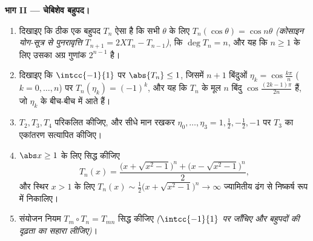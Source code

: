 \begin{problem}
\medskip
\noindent\textbf{भाग II --- चेबिशेव बहुपद।}
\begin{enumerate}[resume]
  \item दिखाइए कि ठीक एक बहुपद $T_n$ ऐसा है कि सभी $\theta$ के लिए $T_n(\cos\theta) = \cos n\theta$
        \emph{(कोसाइन योग-सूत्र से पुनरावृत्ति $T_{n+1} = 2XT_n - T_{n-1}$)}, कि $\deg T_n = n$, और यह कि
        $n \geq 1$ के लिए उसका अग्र गुणांक $2^{n-1}$ है।
  \item दिखाइए कि $\intcc{-1}{1}$ पर $\abs{T_n} \leq 1$, जिसमें $n + 1$ बिंदुओं $\eta_k =
        \cos\frac{k\pi}{n}$ ($k = 0, \dots, n$) पर $T_n(\eta_k) = (-1)^k$,
        और यह कि $T_n$ के मूल $n$ बिंदु $\cos\frac{(2k-1)\pi}{2n}$ हैं, जो $\eta_k$ के बीच-बीच
        में आते हैं।
  \item $T_2, T_3, T_4$ परिकलित कीजिए, और सीधे मान रखकर $\eta_0, \dots, \eta_3 = 1, \frac12, -\frac12,
        -1$ पर $T_3$ का एकांतरण
        सत्यापित कीजिए।
  \item $\abs x \geq 1$ के लिए सिद्ध कीजिए
        \[
        T_n(x) = \frac{\bigl(x + \sqrt{x^2 - 1}\bigr)^n +
        \bigl(x - \sqrt{x^2 - 1}\bigr)^n}{2},
        \]
        और स्थिर $x > 1$ के लिए $T_n(x) \sim \frac12\bigl(x + \sqrt{x^2 -
        1}\bigr)^n \to \infty$ ज्यामितीय ढंग से निष्कर्ष रूप में
        निकालिए।
  \item संयोजन नियम $T_m \circ T_n = T_{mn}$ सिद्ध कीजिए \emph{($\intcc{-1}{1}$ पर जाँचिए और बहुपदों
        की दृढ़ता का सहारा लीजिए)}।
\end{enumerate}


\end{problem}
